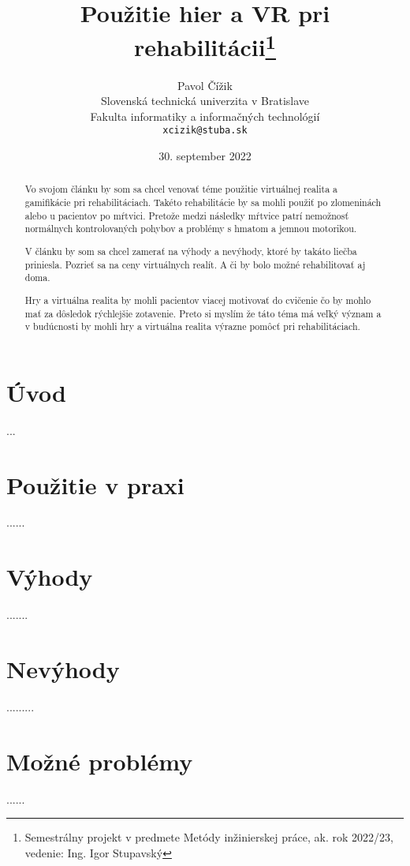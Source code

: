 \documentclass[10pt,twoside,slovak,a4paper]{article}
\title{Použitie hier a VR pri rehabilitácii\thanks{Semestrálny projekt v predmete Metódy inžinierskej práce, ak. rok 2022/23, vedenie: Ing. Igor Stupavský}} %
\author{Pavol Čížik\\[2pt]
	{\small Slovenská technická univerzita v Bratislave}\\
	{\small Fakulta informatiky a informačných technológií}\\
	{\small \texttt{xcizik@stuba.sk}}
	}
\date{\small 30. september 2022}
\begin{document}
\maketitle

\begin{abstract}
Vo svojom článku by som sa chcel venovať téme použitie virtuálnej realita a gamifikácie pri rehabilitáciach. Takéto rehabilitácie by sa mohli použiť po zlomeninách alebo u pacientov po mŕtvici. Pretože medzi následky mŕtvice patrí nemožnosť normálnych kontrolovaných pohybov a problémy s hmatom a jemnou motorikou. 

V článku by som sa chcel zamerať na výhody a nevýhody, ktoré by takáto liečba priniesla. Pozrieť sa na ceny virtuálnych realít. A či by bolo možné rehabilitovať aj doma. 

Hry a virtuálna realita by mohli pacientov viacej motivovať do cvičenie čo by mohlo mať za dôsledok rýchlejšie zotavenie. Preto si myslím že táto téma má veľký význam a v budúcnosti by mohli hry a virtuálna realita výrazne pomôcť pri rehabilitáciach.
\end{abstract}



\section{Úvod}
...



\section{Použitie v praxi} \label{nejaka}
......



\section{Výhody} \label{ina}
.......



\section{Nevýhody} \label{dolezita}
.........\cite{7926560}



\section{Možné problémy} \label{dolezitejsia}
......
\end{document}

